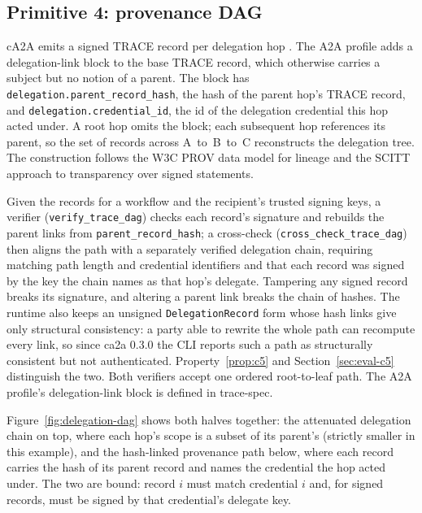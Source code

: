 \subsection{Primitive 4: provenance DAG}\label{subsec:provenance}

cA2A emits a signed TRACE record per delegation hop \citep{trace2025}. The A2A profile adds a
delegation-link block to the base TRACE record, which otherwise carries a subject but no notion
of a parent. The block has \texttt{delegation.parent\_record\_hash}, the hash of the parent
hop's TRACE record, and \texttt{delegation.credential\_id}, the id of the delegation credential
this hop acted under. A root hop omits the block; each subsequent hop references its parent, so
the set of records across A~to~B~to~C reconstructs the delegation tree. The construction follows
the W3C PROV data model \citep{prov2013} for lineage and the SCITT \citep{scitt2024} approach to
transparency over signed statements.

Given the records for a workflow and the recipient's trusted signing keys, a verifier
(\texttt{verify\_trace\_dag}) checks each record's signature and rebuilds the parent links from
\texttt{parent\_record\_hash}; a cross-check (\texttt{cross\_check\_trace\_dag}) then aligns the
path with a separately verified delegation chain, requiring matching path length and credential
identifiers and that each record was signed by the key the chain names as that hop's delegate.
Tampering any signed record breaks its signature, and altering a parent link breaks the chain of
hashes. The runtime also keeps an unsigned \texttt{DelegationRecord} form whose hash links give
only structural consistency: a party able to rewrite the whole path can recompute every link,
so since ca2a 0.3.0 the CLI reports such a path as structurally consistent but not
authenticated. Property~\ref{prop:c5} and Section~\ref{sec:eval-c5} distinguish the two. Both
verifiers accept one ordered root-to-leaf path. The A2A profile's delegation-link block is
defined in trace-spec.

Figure~\ref{fig:delegation-dag} shows both halves together: the attenuated delegation chain
on top, where each hop's scope is a subset of its parent's (strictly smaller in this example), and the hash-linked
provenance path below, where each record carries the hash of its parent record and names the
credential the hop acted under. The two are bound: record $i$ must match credential $i$ and, for
signed records, must be signed by that credential's delegate key.

